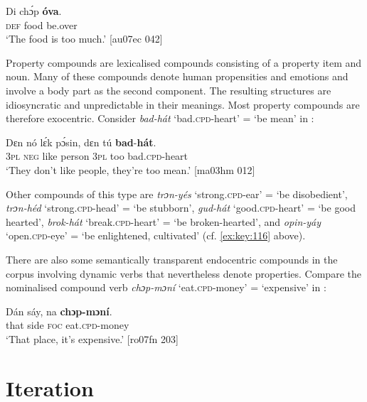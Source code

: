 \ea%
    \label{ex:key:132}
    \gll Di  chɔ́p  \textbf{óva}.\\
\textsc{def}  food    be.over\\

\glt ‘The food is too much.’ [au07ec 042]
\z

Property compounds are lexicalised compounds consisting of a property item and noun. Many of these compounds denote human propensities and emotions and involve a body part\index{} as the second component. The resulting structures are idiosyncratic and unpredictable in their meanings. Most property compounds are therefore exocentric. Consider \textit{bad-hát} ‘bad.\textsc{cpd}{}-heart’ = ‘be mean’ in :


\ea%
    \label{ex:key:133}
    \gll Dɛn  nó  lɛ́k  pɔ́sin,  dɛn  tú  \textbf{bad}-\textbf{hát}.\\
\textsc{3pl}  \textsc{neg}  like  person  \textsc{3pl}  too  bad.\textsc{cpd}{}-heart\\

\glt ‘They don’t like people, they’re too mean.’ [ma03hm 012]
\z

Other compounds of this type are \textit{trɔn-yés} ‘strong.\textsc{cpd}{}-ear’ = ‘be disobedient’, \textit{trɔn-héd} ‘strong.\textsc{cpd}{}-head’ = ‘be stubborn’, \textit{gud-hát} ‘good.\textsc{cpd}{}-heart’ = ‘be good hearted’, \textit{brok-hát} ‘break.\textsc{cpd}{}-heart’ = ‘be broken-hearted’, and \textit{opin-yáy} ‘open.\textsc{cpd}{}-eye’ = ‘be enlightened, cultivated’ (cf. \ref{ex:key:116} above).


 There are also some semantically transparent endocentric compounds in the corpus involving dynamic verbs  that nevertheless denote properties. Compare the nominalised compound verb \textit{chɔp-mɔní} ‘eat.\textsc{cpd}{}-money’ = ‘expensive’ in :



\ea%
    \label{ex:key:134}
    \gll Dán    sáy,    na  \textbf{chɔp-mɔní}.\\
that    side    \textsc{foc}  eat.\textsc{cpd}{}-money\\

\glt ‘That place, it’s expensive.’ [ro07fn 203]
\z

\section{Iteration}\label{sec:4.5}

